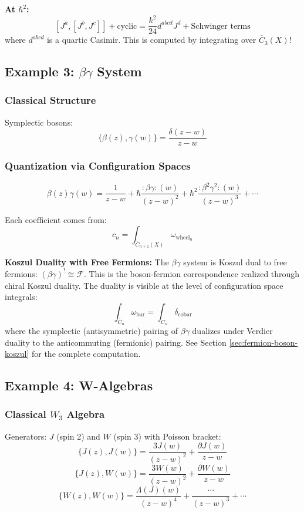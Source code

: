 \textbf{At $\hbar^2$:}
$$[J^a, [J^b, J^c]] + \text{cyclic} = \frac{k^2}{24} d^{abcd} J^d + \text{Schwinger terms}$$
where $d^{abcd}$ is a quartic Casimir. This is computed by integrating over $\overline{C}_3(X)$!

\subsection{Example 3: $\beta\gamma$ System}

\subsubsection{Classical Structure}

Symplectic bosons:
$$\{\beta(z), \gamma(w)\} = \frac{\delta(z-w)}{z-w}$$

\subsubsection{Quantization via Configuration Spaces}

$$\beta(z)\gamma(w) = \frac{1}{z-w} + \hbar \frac{:\beta\gamma:(w)}{(z-w)^2} + \hbar^2 \frac{:\beta^2\gamma^2:(w)}{(z-w)^3} + \cdots$$

Each coefficient comes from:
$$c_n = \int_{\overline{C}_{n+1}(X)} \omega_{\text{wheel}_n}$$

\textbf{Koszul Duality with Free Fermions:}
The $\beta\gamma$ system is Koszul dual to free fermions: $(\beta\gamma)^! \cong \mathcal{F}$. This is the boson-fermion correspondence realized through chiral Koszul duality. The duality is visible at the level of configuration space integrals:
$$\int_{\overline{C}_n} \omega_{\text{bar}} = \int_{C_n} \delta_{\text{cobar}}$$
where the symplectic (antisymmetric) pairing of $\beta\gamma$ dualizes under Verdier duality to the anticommuting (fermionic) pairing. See Section \ref{sec:fermion-boson-koszul} for the complete computation.

\subsection{Example 4: W-Algebras}

\subsubsection{Classical $W_3$ Algebra}

Generators: $J$ (spin 2) and $W$ (spin 3) with Poisson bracket:
$$\{J(z), J(w)\} = \frac{3J(w)}{(z-w)^2} + \frac{\partial J(w)}{z-w}$$
$$\{J(z), W(w)\} = \frac{3W(w)}{(z-w)^2} + \frac{\partial W(w)}{z-w}$$
$$\{W(z), W(w)\} = \frac{\Lambda(J)(w)}{(z-w)^4} + \frac{\cdots}{(z-w)^3} + \cdots$$


